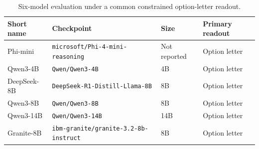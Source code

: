 \begin{table}[t]
\centering
\caption{Six-model evaluation under a common constrained option-letter readout.}
\label{tab:models}
\small
\setlength{\tabcolsep}{3.5pt}
\begin{tabular}{llll}
\toprule
Short name & Checkpoint & Size & Primary readout \\
\midrule
Phi-mini & \texttt{microsoft/Phi-4-mini-reasoning} & Not reported & Option letter \\
Qwen3-4B & \texttt{Qwen/Qwen3-4B} & 4B & Option letter \\
DeepSeek-8B & \texttt{DeepSeek-R1-Distill-Llama-8B} & 8B & Option letter \\
Qwen3-8B & \texttt{Qwen/Qwen3-8B} & 8B & Option letter \\
Qwen3-14B & \texttt{Qwen/Qwen3-14B} & 14B & Option letter \\
Granite-8B & \texttt{ibm-granite/granite-3.2-8b-instruct} & 8B & Option letter \\
\bottomrule
\end{tabular}
\end{table}
